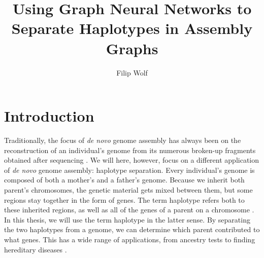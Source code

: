 \documentclass[times, utf8, diplomski, english]{fer_eng}
\begin{document}

\title{Using Graph Neural Networks to Separate Haplotypes in Assembly Graphs}

\author{Filip Wolf}

\maketitle



\zahvala{}

\tableofcontents

\chapter{Introduction}

Traditionally, the focus of \textit{de novo} genome assembly has always been on the reconstruction of an individual's genome from its numerous broken-up fragments obtained after sequencing \cite{de_novo2}. We will here, however, focus on a different application of \textit{de novo} genome assembly: haplotype separation. Every individual's genome is composed of both a mother's and a father's genome. Because we inherit both parent's chromosomes, the genetic material gets mixed between them, but some regions stay together in the form of genes. The term haplotype refers both to these inherited regions, as well as all of the genes of a parent on a chromosome \cite{haplotype}. In this thesis, we will use the term haplotype in the latter sense. By separating the two haplotypes from a genome, we can determine which parent contributed to what genes. This has a wide range of applications, from ancestry tests to finding hereditary diseases \cite{haplotype_usage}.         
\end{document}
